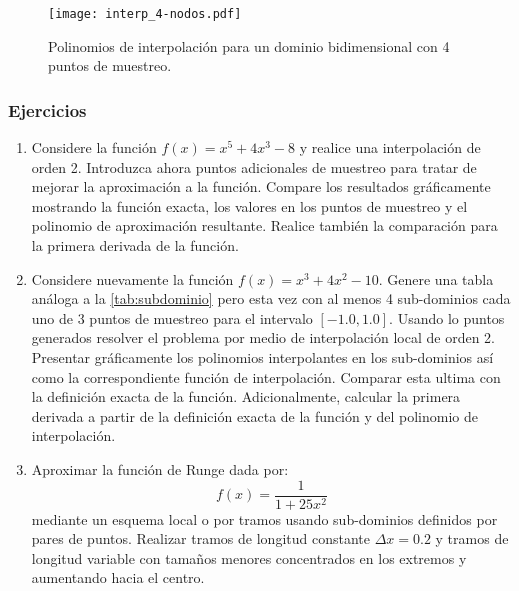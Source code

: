 \begin{figure}[H]
  \centering
  \texttt{[image: interp\_4-nodos.pdf]}
  \caption{Polinomios de interpolación para un dominio bidimensional con 4 puntos de muestreo.}
  \label{fig:interp_4-nodos}
\end{figure}

\newpage
\subsubsection{Ejercicios}
\begin{enumerate}
	
	\item \label{ejer:inter1} Considere la función $f(x) = x^5 + 4x^3 - 8$ y realice una interpolación de 
	orden 2. Introduzca ahora puntos adicionales de muestreo  para tratar de 
	mejorar la aproximación a la función. Compare los resultados gráficamente 
	mostrando la función exacta, los valores en los puntos de muestreo y el 
	polinomio de aproximación resultante. Realice también la comparación para la 
	primera derivada de la función.
	
	\item \label{ejer:inter2}
	Considere nuevamente la función $f(x) = {x^3} + 4{x^2} - 10$. Genere una tabla análoga a la \cref{tab:subdominio} pero esta vez con al menos 4 sub-dominios cada uno de 3 puntos de muestreo para el intervalo $[-1.0, 1.0]$. Usando lo puntos generados resolver el problema por medio de interpolación local de orden 2. Presentar gráficamente los polinomios interpolantes en los sub-dominios así como la correspondiente función de interpolación. Comparar esta ultima con la definición exacta de la función. Adicionalmente, calcular la primera derivada a partir de la definición exacta de la función y del polinomio de interpolación.
	
\item \label{ejer:inter3}
	Aproximar la función de Runge dada por:
	\[f(x) = \frac{1}{1 + 25x^2}\]
	mediante un esquema local o por tramos usando sub-dominios definidos por pares de puntos. Realizar tramos de longitud constante $\Delta x = 0.2$ y tramos de longitud variable con tamaños menores concentrados en los extremos y aumentando hacia el centro.
	
	
\end{enumerate}
